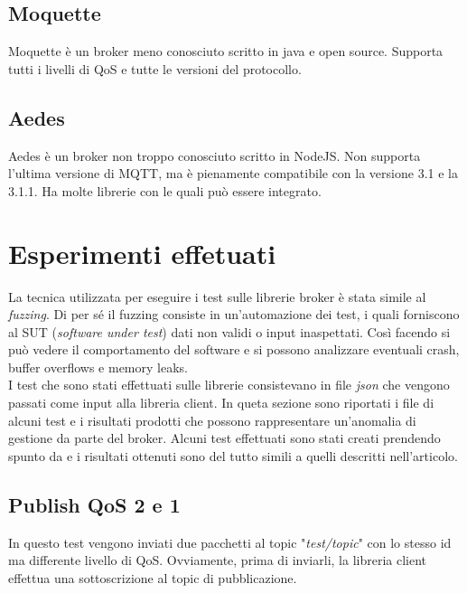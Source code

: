 \documentclass[binding=0.6cm,TFA]{sapthesis}
\begin{document}
\begin{large}
\subsection{Moquette}
Moquette \cite{Moquette} è un broker meno conosciuto scritto in java e open source. Supporta tutti i livelli di QoS e tutte le versioni del protocollo.

\subsection{Aedes}
Aedes \cite{Aedes} è un broker non troppo conosciuto scritto in NodeJS. Non supporta l'ultima versione di MQTT, ma è pienamente compatibile con la versione 3.1 e la 3.1.1. Ha molte librerie con le quali può essere integrato.

\section{Esperimenti effetuati}
La tecnica utilizzata per eseguire i test sulle librerie broker è stata simile al \textit{fuzzing}. Di per sé il fuzzing consiste in un'automazione dei test, i quali forniscono al SUT (\textit{software under test}) dati non validi o input inaspettati. Così facendo si può vedere il comportamento del software e si possono analizzare eventuali crash, buffer overflows e memory leaks. \\

I test che sono stati effettuati sulle librerie consistevano in file \textit{json} che vengono passati come input alla libreria client. In queta sezione sono riportati i file di alcuni test e i risultati prodotti che possono rappresentare un'anomalia di gestione da parte del broker.
Alcuni test effettuati sono stati creati prendendo spunto da \cite{articleTestsMQTT} e i risultati ottenuti sono del tutto simili a quelli descritti nell'articolo.
\newpage

\subsection{Publish QoS 2 e 1}
\label{chap:publishqos2e1}

\begin{python}
\end{python}
In questo test vengono inviati due pacchetti al topic "\textit{test/topic}" con lo stesso id ma differente livello di QoS. Ovviamente, prima di inviarli, la libreria client effettua una sottoscrizione al topic di pubblicazione. \\


\end{large}
\end{document}
